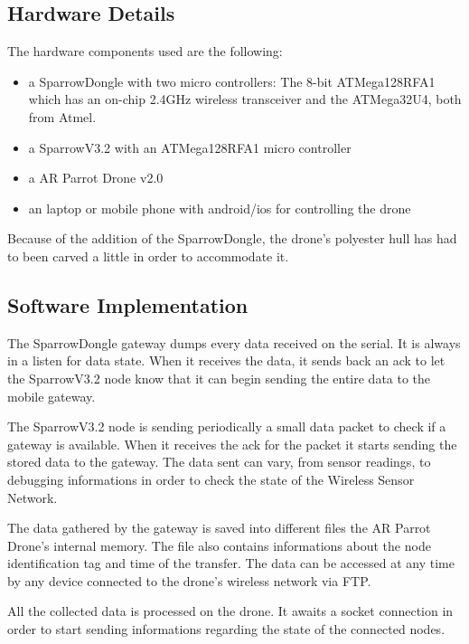 \label{chap:impl}

 \subsection{Hardware Details}

The hardware components used are the following:
\begin{itemize}

\item a SparrowDongle with two micro controllers: The 8-bit ATMega128RFA1 which has an on-chip 2.4GHz wireless transceiver and the ATMega32U4, both from Atmel.

\item a SparrowV3.2  with an ATMega128RFA1 micro controller 

\item a AR Parrot Drone v2.0

\item an laptop or mobile phone with android/ios for controlling the drone

\end{itemize}

Because of the addition of the SparrowDongle, the drone's polyester hull has had to been carved a little in order to accommodate it.
 

\subsection{Software Implementation}

The SparrowDongle gateway dumps every data received on the serial. It is always in a listen for data state. When it receives the data, it sends back an ack to let the SparrowV3.2 node know that it can begin sending the entire data to the mobile gateway. 

The SparrowV3.2 node is sending periodically a small data packet to check if a gateway is available. When it receives the ack for the packet it starts sending the stored data to the gateway. The data sent can vary, from sensor readings, to debugging informations in order to check the state of the Wireless Sensor Network.

The data gathered by the gateway is saved into different files the AR Parrot Drone's internal memory. The file also contains informations about the node identification tag and time of the transfer. The data can be accessed at any time by any device connected to the drone's wireless network via FTP.

All the collected data is processed on the drone. It awaits a socket connection in order to start sending informations regarding the state of the connected nodes.
